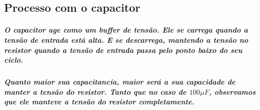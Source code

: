 \documentclass[12pt,twoside, a4paper, twocolumn]{article}
\begin{document}
\begin{adjustbox}{scale=0.5}

\end{adjustbox}

\subsection{Processo com o capacitor}

\subparagraph*{O capacitor age como um buffer de tensão. Ele se carrega quando a tensão de entrada está alta. E se descarrega, mantendo a tensão no resistor quando a tensão de entrada passa pelo ponto baixo do seu ciclo.}

\subparagraph*{Quanto maior sua capacitancia, maior será a sua capacidade de manter a tensão do resistor. Tanto que no caso de $100 \mu F$, observamos que ele manteve a tensão do resistor completamente.}
\end{document}
